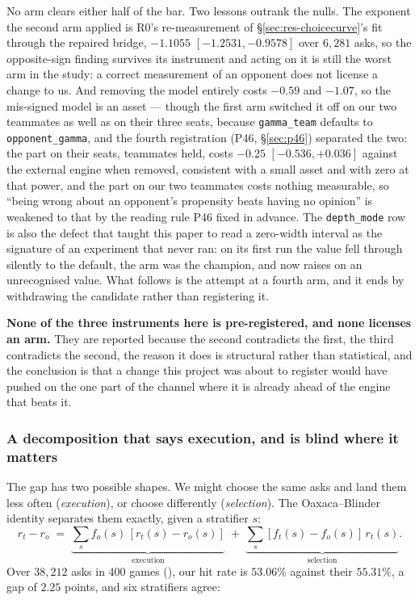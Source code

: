 \documentclass[11pt,letterpaper]{article}
\begin{document}
\noindent No arm clears either half of the bar. Two lessons outrank the
nulls. The exponent the second arm applied is R0's re-measurement of
\S\ref{sec:res-choicecurve}'s fit through the repaired bridge, $-1.1055$
$[-1.2531, -0.9578]$ over $6{,}281$ asks, so the opposite-sign finding
survives its instrument and acting on it is still the worst arm in the study:
a correct measurement of an opponent does not license a change to us. And
removing the model entirely costs $-0.59$ and $-1.07$, so the mis-signed model
is an asset --- though the first arm switched it off on our two teammates as
well as on their three seats, because \texttt{gamma\_team} defaults to
\texttt{opponent\_gamma}, and the fourth registration (P46, \S\ref{sec:p46})
separated the two: the part on their seats, teammates held, costs $-0.25$
$[-0.536, +0.036]$ against the external engine when removed, consistent with a small asset
and with zero at that power, and the part on our two teammates costs nothing
measurable, so ``being wrong about an opponent's propensity beats having no
opinion'' is weakened to that by the reading rule P46 fixed in advance. The
\texttt{depth\_mode} row is also the defect that taught this paper to read a
zero-width interval as the signature of an experiment that never ran: on its
first run the value fell through silently to the default, the arm was the
champion, and  now raises on an unrecognised value.
What follows is the attempt at a fourth arm, and it ends by withdrawing the
candidate rather than registering it.

\textbf{None of the three instruments here is pre-registered, and none licenses
an arm.} They are reported because the second contradicts the first, the third
contradicts the second, the reason it does is structural rather than
statistical, and the conclusion is that a change this project was about to
register would have pushed on the one part of the channel where it is already
ahead of the engine that beats it.

\subsubsection{A decomposition that says execution, and is blind where it
matters}

The gap has two possible shapes. We might choose the same asks and land them
less often (\emph{execution}), or choose differently (\emph{selection}). The
Oaxaca--Blinder identity separates them exactly, given a stratifier $s$:
\[
r_t - r_o \;=\; \underbrace{\textstyle\sum_s f_o(s)\,[r_t(s) - r_o(s)]}_{\text{execution}}
\;+\; \underbrace{\textstyle\sum_s [f_t(s) - f_o(s)]\,r_t(s)}_{\text{selection}} .
\]
Over $38{,}212$ asks in $400$ games (),
our hit rate is $53.06\%$ against their $55.31\%$, a gap of $2.25$ points, and
six stratifiers agree:
\end{document}

